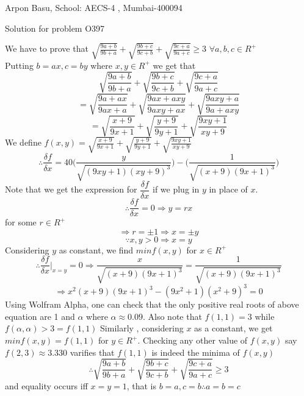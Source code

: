 \documentclass[10pt,a4paper]{extarticle}
\begin{document}
\begin{center}


Arpon Basu, School: AECS-4 , Mumbai-400094

Solution for problem O397
\end{center}

We have to prove that $\sqrt{\frac{9a+b}{9b+a}} + \sqrt{\frac{9b+c}{9c+b}}+ \sqrt{\frac{9c+a}{9a+c}} \ge 3$  $ \forall a,b,c \in R^+$ \\
Putting $b=ax,c=by $ where $ x,y \in R^+ $ we get that \\

$$\sqrt{\frac{9a+b}{9b+a}} + \sqrt{\frac{9b+c}{9c+b}}+ \sqrt{\frac{9c+a}{9a+c}} $$
$$=\sqrt{\frac{9a+ax}{9ax+a}} + \sqrt{\frac{9ax+axy}{9axy+ax}}+ \sqrt{\frac{9axy+a}{9a+axy}} $$
$$=\sqrt{\frac{x+9}{9x+1}} + \sqrt{\frac{y+9}{9y+1}}+ \sqrt{\frac{9xy+1}{xy+9}} $$
We define $f(x,y)=\sqrt{\frac{x+9}{9x+1}} + \sqrt{\frac{y+9}{9y+1}}+ \sqrt{\frac{9xy+1}{xy+9}}$
$$ \therefore \dfrac{\delta f}{\delta x}=40 \bigg(\dfrac{y}{\sqrt{(9xy+1)(xy+9)^3}} \bigg)-\bigg(\dfrac{1}{\sqrt{(x+9)(9x+1)^3}}\bigg) $$
Note that we get the expression for $\dfrac{\delta f}{\delta x}$ if we plug in $y$ in place of $x$.
$$ \therefore \dfrac{\delta f}{\delta x}=0 \Rightarrow y=rx $$ for some $r\in R^+$ \\
$$ \Rightarrow r=\pm 1 \Rightarrow x=\pm y  $$
$$ \because x,y >0 \Rightarrow x=y $$
Considering $y$ as constant, we find $min f(x,y) $ for $ x\in R^+ $\\
$$ \therefore  \dfrac{\delta f}{\delta x}|_{x=y}=0 \Rightarrow \frac{x}{\sqrt{(x+9)(9x+1)^3}}=\frac{1}{\sqrt{(x+9)(9x+1)^3}} $$
$$\Rightarrow x^2 (x+9)(9x+1)^3 -(9x^2+1)(x^2+9)^{3}=0 $$
Using Wolfram Alpha, one can check that the only positive real roots of above equation are 1 and $\alpha$  where $\alpha \approx 0.09 $. Also note that $f(1,1) =3 $
while $f(\alpha , \alpha) >3 = f(1,1)$
Similarly , considering $x$ as a constant, we get $min f(x,y) =f(1,1)$ for $ y\in R^+ $. Checking any other value of $f(x,y)$ say $f(2,3) \approx 3.330$ varifies that 
$f(1,1)$ is indeed the minima of $f(x,y)$
$$ \therefore \sqrt{\frac{9a+b}{9b+a}} + \sqrt{\frac{9b+c}{9c+b}}+ \sqrt{\frac{9c+a}{9a+c}} \ge 3 $$ and equality occurs iff $x=y=1$, that is $b=a , c=b \therefore a=b=c$
\end{document}
